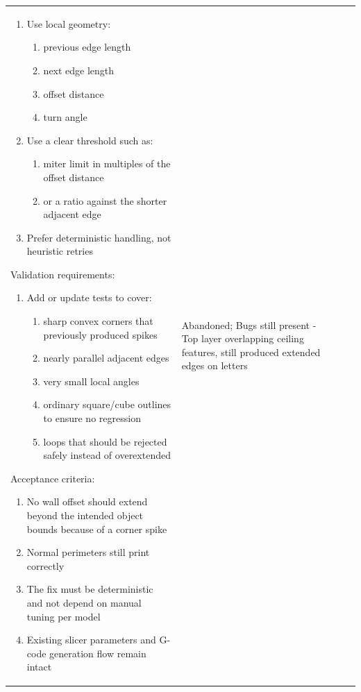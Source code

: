\documentclass[10pt,twocolumn,a4paper]{article}
\begin{document}
\begin{longtable}{@{}p{0.6cm}p{1.5cm}p{11.0cm}p{2.7cm}@{}}
\begin{enumerate}
\begin{enumerate}
		\item{shouldBevelJoin(...)}
		\item{buildBevelJoin(...)}
	\end{enumerate}
	\item{Use local geometry:}
	\begin{enumerate}
		\item{previous edge length}
		\item{next edge length}
		\item{offset distance}
		\item{turn angle}
	\end{enumerate}
	\item{Use a clear threshold such as:}
	\begin{enumerate}
		\item{miter limit in multiples of the offset distance}
		\item{or a ratio against the shorter adjacent edge}
	\end{enumerate}
	\item{Prefer deterministic handling, not heuristic retries}
\end{enumerate}
Validation requirements:
\begin{enumerate}
	\item{Add or update tests to cover:}
	\begin{enumerate}
		\item{sharp convex corners that previously produced spikes}
		\item{nearly parallel adjacent edges}
		\item{very small local angles}
		\item{ordinary square/cube outlines to ensure no regression} 
		\item{loops that should be rejected safely instead of overextended}
	\end{enumerate}
\end{enumerate} 
Acceptance criteria:
\begin{enumerate}
	\item{No wall offset should extend beyond the intended object bounds because of a corner spike}
	\item{Normal perimeters still print correctly}
	\item{The fix must be deterministic and not depend on manual tuning per model}
	\item{Existing slicer parameters and G-code generation flow remain intact}
\end{enumerate} & Abandoned; Bugs still present - Top layer overlapping ceiling features, still produced extended edges on letters \\

\end{longtable}
\end{document}
